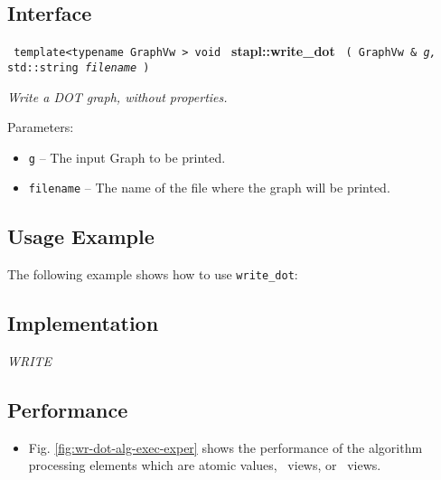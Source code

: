 \subsection{Interface} \label{sec-wr-dot-alg-inter}

\noindent
\texttt{%
template<typename GraphVw >
\newline
void 
}
\newline
\textbf{stapl::write\_dot}%
\newline
\texttt{%
(
GraphVw \&
\textit{g,}%
std::string
\textit{filename}%
)     
}
\vspace{0.4cm}

\textit{
Write a DOT graph, without properties.
}
\vspace{0.4cm}

Parameters:
\begin{itemize}
\item
\texttt{g} --
The input Graph to be printed.
\item
\texttt{filename} --
The name of the file where the graph will be printed.
\end{itemize}

\subsection{Usage Example} \label{sec-wr-dot-alg-use}

The following example shows how to use 
\texttt{write\_dot}:


\subsection{Implementation} \label{sec-wr-dot-alg-impl}

\textit{WRITE}

\subsection{Performance} \label{sec-wr-dot-alg-perf}

\begin{itemize}
\item
Fig. \ref{fig:wr-dot-alg-exec-exper}
shows the performance of the algorithm processing
elements which are atomic values, \stl\ views, or \stapl\ views.
\end{itemize}

